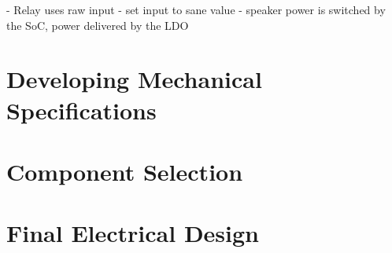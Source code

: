 \documentclass[12pt]{article}
\begin{document}
  - Relay uses raw input - set input to sane value
  - speaker power is switched by the SoC, power delivered by the LDO
	
	\section{Developing Mechanical Specifications}
	
	
	\section{Component Selection}
	
	\section{Final Electrical Design}
	
	
    \printglossaries
    
    \printbibliography[heading=bibintoc]
	
\end{document}
